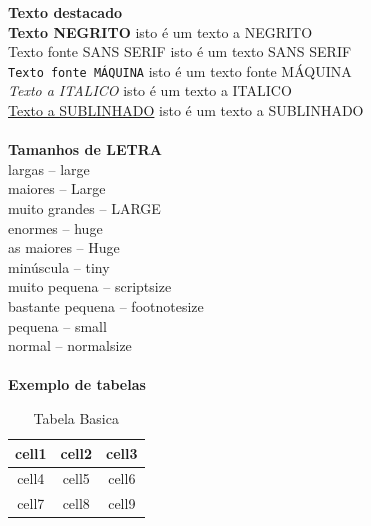 \documentclass[11pt,a4paper]{report}%
\begin{document}
\textbf{Texto destacado}\\

 \textbf{Texto NEGRITO} isto é um texto a NEGRITO \\%
 \textsf{Texto fonte SANS SERIF} isto é um texto SANS SERIF \\ %
 \texttt{Texto fonte MÁQUINA}  isto é um texto fonte MÁQUINA\\ %
 \textit{Texto a ITALICO} isto é um texto a ITALICO\\ %
 \underline{Texto a SUBLINHADO} isto é um texto a SUBLINHADO \\\\ %

\textbf{Tamanhos de LETRA}\\

\large{largas -- large}\\
\Large{maiores -- Large}\\
\LARGE{muito grandes -- LARGE}\\
\huge{enormes --  huge}\\
\Huge{as maiores -- Huge}\\
\tiny{minúscula  -- tiny}\\
\scriptsize{muito pequena -- scriptsize} \\
\footnotesize{bastante pequena  -- footnotesize}\\
\small{pequena -- small}\\
\normalsize{normal -- normalsize}\\\\

\textbf{Exemplo de tabelas}\\
\begin{table}[h!] %
\begin{center} %
\begin{tabular}{ | c | c | c | } %
  \hline  %
  cell1 & cell2 & cell3 \\
  \hline
  cell4 & cell5 & cell6 \\
  cell7 & cell8 & cell9 \\
  \hline
\end{tabular}
\end{center}
\caption{Tabela Basica} \label{tab:tabelaBasica}
\end{table}
\end{document}
